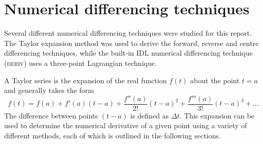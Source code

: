 \chapter{Numerical differencing techniques}
\label{chap:numdiff}

Several different numerical differencing techniques were studied for this report. The Taylor expansion method was used to derive the forward, reverse and centre differencing techniques, while the built-in IDL numerical differencing technique (\textsc{deriv}) uses a three-point Lagrangian technique. 

A Taylor series is the expansion of the real function $f(t)$ about the point $t=a$ and generally takes the form
\begin{equation}
f(t) = f(a) + f'(a)(t-a) +  \frac{f''(a)}{2!}(t-a)^{2} + \frac{f'''(a)}{3!}(t-a)^{3}  + ...
\end{equation}
The difference between points $(t-a)$ is defined as $\Delta t$. This expansion can be used to determine the numerical derivative of a given point using a variety of different methods, each of which is outlined in the following sections.

















